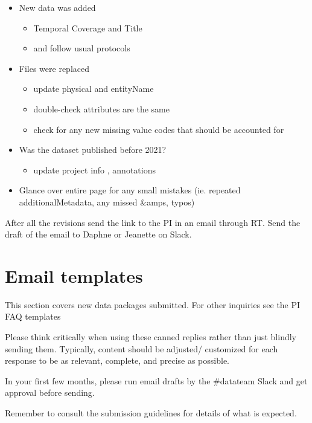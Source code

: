 \documentclass[
  letterpaper,
  DIV=11,
  numbers=noendperiod]{scrreprt}
\providecommand{\tightlist}{%
  \setlength{\itemsep}{0pt}\setlength{\parskip}{0pt}}\usepackage{longtable,booktabs,array}
\begin{document}
\begin{itemize}
\tightlist
\item
  New data was added

  \begin{itemize}
  \tightlist
  \item
    Temporal Coverage and Title
  \item
    and follow usual protocols
  \end{itemize}
\item
  Files were replaced

  \begin{itemize}
  \tightlist
  \item
    update physical and entityName
  \item
    double-check attributes are the same
  \item
    check for any new missing value codes that should be accounted for
  \end{itemize}
\item
  Was the dataset published before 2021?

  \begin{itemize}
  \tightlist
  \item
    update project info , annotations
  \end{itemize}
\item
  Glance over entire page for any small mistakes (ie. repeated
  additionalMetadata, any missed \&amps, typos)
\end{itemize}

After all the revisions send the link to the PI in an email through RT.
Send the draft of the email to Daphne or Jeanette on Slack.

\hypertarget{email-templates}{%
\section{Email templates}\label{email-templates}}

This section covers new data packages submitted. For other inquiries see
the PI FAQ templates

Please think critically when using these canned replies rather than just
blindly sending them. Typically, content should be adjusted/ customized
for each response to be as relevant, complete, and precise as possible.

In your first few months, please run email drafts by the \#datateam
Slack and get approval before sending.

Remember to consult the submission guidelines for details of what is
expected.
\end{document}
